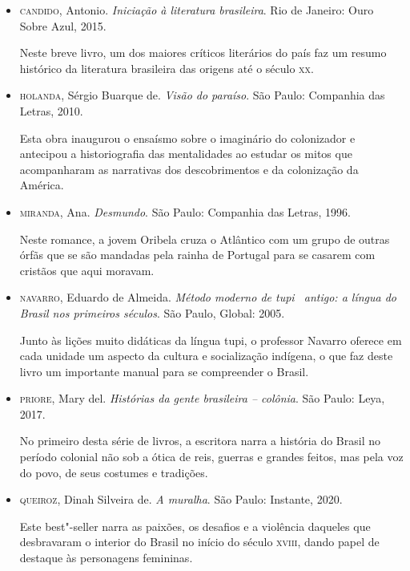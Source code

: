 \documentclass[12pt]{extarticle}
\begin{document}
{\begin{itemize}
\begin{itemize}
O professor traça a evolução do império marítimo português desde as
primeiras viagens, no início do século \textsc{xv}, até a independência do
Brasil.

\item\textsc{candido}, Antonio. \textit{Iniciação à literatura brasileira}. Rio de
Janeiro: Ouro Sobre Azul, 2015.

Neste breve livro, um dos maiores críticos literários do país faz um
resumo histórico da literatura brasileira das origens até o século \textsc{xx}.

\item\textsc{holanda}, Sérgio Buarque de. \textit{Visão do paraíso}. São Paulo:
Companhia das Letras, 2010.

Esta obra inaugurou o ensaísmo sobre o imaginário do colonizador e
antecipou a historiografia das mentalidades ao estudar os mitos que
acompanharam as narrativas dos descobrimentos e da colonização da
América.

\item\textsc{miranda}, Ana. \textit{Desmundo}. São Paulo: Companhia das Letras, 1996.

Neste romance, a jovem Oribela cruza o Atlântico com um grupo de outras
órfãs que se são mandadas pela rainha de Portugal para se casarem com
cristãos que aqui moravam.

\item\textsc{navarro}, Eduardo de Almeida. \textit{Método moderno de tupi~
antigo: a língua do Brasil nos primeiros séculos}. São Paulo, Global: 2005.

Junto às lições muito didáticas da língua tupi, o professor Navarro 
oferece em cada unidade um aspecto da cultura e socialização indígena, 
o que faz deste livro um importante manual para se compreender o Brasil.

\item\textsc{priore}, Mary del. \textit{Histórias da gente brasileira -- colônia}. São Paulo: Leya, 2017.

No primeiro desta série de livros, a escritora narra a história do
Brasil no período colonial não sob a ótica de reis, guerras e grandes
feitos, mas pela voz do povo, de seus costumes e tradições.


\item\textsc{queiroz}, Dinah Silveira de. \textit{A muralha}. São Paulo: Instante,
2020.

Este best"-seller narra as paixões, os desafios e a violência daqueles
que desbravaram o interior do Brasil no início do século \textsc{xviii}, dando
papel de destaque às personagens femininas.


\end{itemize}
\end{itemize}}
\end{document}
